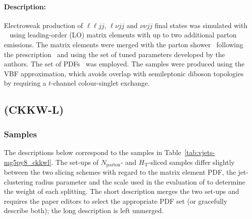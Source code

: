\paragraph{Description:}

Electroweak production of $\ell\ell jj$, $\ell\nu jj$ and $\nu\nu jj$ final states
was simulated with \SHERPA[2.2.1]~\cite{Bothmann:2019yzt} using 
leading-order (LO) matrix elements with up to two additional parton emissions. 
The matrix elements were merged with the \SHERPA parton
shower~\cite{Schumann:2007mg} following the \MEPSatLO
prescription~\cite{Catani:2001cc} and using the set of tuned
parameters developed by the \SHERPA authors.  The \NNPDF[3.0nnlo] set of
PDFs~\cite{Ball:2014uwa} was employed. The samples were produced
using the VBF approximation, which avoids overlap  with semileptonic
diboson topologies by requiring a $t$-channel colour-singlet exchange.



\subsection[MadGraph5 (CKKW-L)]{\MADGRAPH (CKKW-L)}

\subsubsection*{Samples}

The descriptions below correspond to the samples in
Table~\ref{tab:vjets-mg5py8_ckkwl}. The set-ups of $N_\text{parton}$- and
$H_\text{T}$-sliced samples differ slightly between the two slicing schemes 
with regard to the matrix element PDF, the jet-clustering radius parameter 
and the scale used in the evaluation of  \alphas to determine the weight of
each splitting. The short description merges the two set-ups and requires 
the paper editors to select the appropriate PDF set (or gracefully describe 
both); the long description is left unmerged. 

